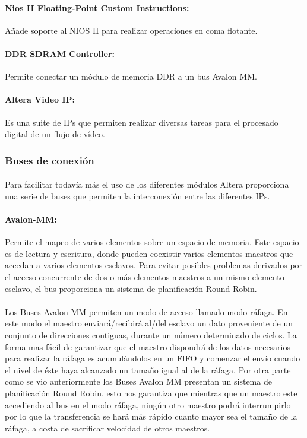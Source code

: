 \documentclass[a4paper,12pt,titlepage,final]{book}
\begin{document}
\paragraph{Nios II Floating-Point Custom Instructions:}
Añade soporte al NIOS II para realizar operaciones en coma flotante.

\paragraph{DDR SDRAM Controller:}
Permite conectar un módulo de memoria DDR a un bus Avalon MM.

\paragraph{Altera Video IP:}
Es una suite de IPs que permiten realizar diversas tareas para el procesado digital de un flujo de vídeo.

\subsubsection{Buses de conexión}

\paragraph{}
Para facilitar todavía más el uso de los diferentes módulos Altera proporciona una serie de buses que permiten la interconexión entre las diferentes IPs.

\paragraph{Avalon-MM:}
Permite el mapeo de varios elementos sobre un espacio de memoria. Este espacio es de lectura y escritura, donde pueden coexistir varios elementos maestros que accedan a varios elementos esclavos. Para evitar posibles problemas derivados por el acceso concurrente de dos o más elementos maestros a un mismo elemento esclavo, el bus proporciona un sistema de planificación Round-Robin.

\paragraph{}
Los Buses Avalon MM permiten un modo de acceso llamado modo ráfaga. En este modo el maestro enviará/recibirá al/del esclavo un dato proveniente de un conjunto de direcciones contiguas, durante un número determinado de ciclos. La forma mas fácil de garantizar que el maestro dispondrá de los datos necesarios para realizar la ráfaga es acumulándolos en un FIFO y comenzar el envío cuando el nivel de éste haya alcanzado un tamaño igual al de la ráfaga. Por otra parte como se vio anteriormente los Buses Avalon MM presentan un sistema de planificación Round Robin, esto nos garantiza que mientras que un maestro este accediendo al bus en el modo ráfaga, ningún otro maestro podrá interrumpirlo por lo que la transferencia se hará más rápido cuanto mayor sea el tamaño de la ráfaga, a costa de sacrificar velocidad de otros maestros. 
\end{document}
